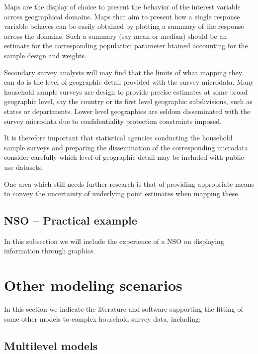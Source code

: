 \documentclass[
  12pt,
]{book}
\begin{document}
Maps are the display of choice to present the behavior of the interest variable across geographical domains. Maps that aim to present how a single response variable behaves can be easily obtained by plotting a summary of the response across the domains. Such a summary (say mean or median) should be an estimate for the corresponding population parameter btained accounting for the sample design and weights.

Secondary survey analysts will may find that the limits of what mapping they can do is the level of geographic detail provided with the survey microdata. Many household sample surveys are design to provide precise estimates at some broad geographic level, say the country or its first level geographic subdivisions, such as states or departments. Lower level geographies are seldom disseminated with the survey microdata due to confidentiality protection constraints imposed.

It is therefore important that statistical agencies conducting the household sample surveys and preparing the dissemination of the corresponding microdata consider carefully which level of geographic detail may be included with public use datasets.

One area which still needs further research is that of providing appropriate means to convey the uncertainty of underlying point estimates when mapping these.

\hypertarget{nso-practical-example-3}{%
\section{NSO -- Practical example}\label{nso-practical-example-3}}

In this subsection we will include the experience of a NSO on displaying information through graphics.

\hypertarget{other-modeling-scenarios}{%
\chapter{Other modeling scenarios}\label{other-modeling-scenarios}}

In this section we indicate the literature and software supporting the fitting of some other models to complex household survey data, including:

\hypertarget{multilevel-models}{%
\section{Multilevel models}\label{multilevel-models}}
\end{document}
